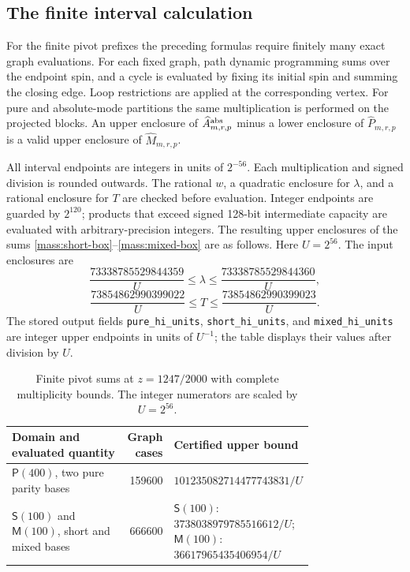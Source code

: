 \documentclass[11pt]{amsart}
\theoremstyle{definition}
\theoremstyle{remark}
\numberwithin{equation}{section}
\begin{document}
\subsection{The finite interval calculation}

For the finite pivot prefixes the preceding formulas require finitely
many exact graph evaluations. For each fixed graph, path dynamic
programming sums over the endpoint spin, and a cycle is evaluated by
fixing its initial spin and summing the closing edge. Loop restrictions
are applied at the corresponding vertex. For pure and absolute-mode
partitions the same multiplication is performed on the projected
blocks. An upper enclosure of $\widehat A^{\rm abs}_{m,r,p}$ minus
a lower enclosure of $\widehat P_{m,r,p}$ is a valid upper enclosure
of $\widehat M_{m,r,p}$.

All interval endpoints are integers in units of $2^{-56}$. Each
multiplication and signed division is rounded outwards. The rational
$w$, a quadratic enclosure for $\lambda$, and a rational enclosure
for $T$ are checked before evaluation. Integer endpoints are guarded
by $2^{120}$; products that exceed signed 128-bit intermediate capacity
are evaluated with arbitrary-precision integers. The resulting upper
enclosures of the sums
\eqref{mass:short-box}--\eqref{mass:mixed-box} are as follows.
Here $U=2^{56}$. The input enclosures are
\[
 \frac{73338785529844359}{U}\le\lambda\le
 \frac{73338785529844360}{U},
\]\[
 \frac{73854862990399022}{U}\le T\le
 \frac{73854862990399023}{U}.
\]
The stored output fields \texttt{pure\_hi\_units},
\texttt{short\_hi\_units}, and \texttt{mixed\_hi\_units} are integer
upper endpoints in units of $U^{-1}$; the table displays their values
after division by $U$.

\begin{table}[htbp]
\centering
\caption{Finite pivot sums at $z=1247/2000$ with complete multiplicity
bounds. The integer numerators are scaled by $U=2^{56}$.}
\label{tab:mass-boxes}
\begin{tabular}{p{0.40\linewidth}r p{0.36\linewidth}}
\hline
Domain and evaluated quantity & Graph cases & Certified upper bound\\
\hline
$\mathsf P(400)$, two pure parity bases
 &159600&$101235082714477743831/U$\\
$\mathsf S(100)$ and $\mathsf M(100)$, short and mixed bases
 &666600&$\mathsf S(100)$: $3738038979785516612/U$;
 $\mathsf M(100)$: $36617965435406954/U$\\
\hline
\end{tabular}
\end{table}
\end{document}
